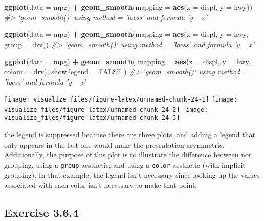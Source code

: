 \documentclass[]{book}
\newenvironment{Shaded}{\begin{snugshade}}{\end{snugshade}}
\newcommand{\CommentTok}[1]{\textcolor[rgb]{0.56,0.35,0.01}{\textit{#1}}}
\newcommand{\DataTypeTok}[1]{\textcolor[rgb]{0.13,0.29,0.53}{#1}}
\newcommand{\KeywordTok}[1]{\textcolor[rgb]{0.13,0.29,0.53}{\textbf{#1}}}
\newcommand{\NormalTok}[1]{#1}
\newcommand{\OperatorTok}[1]{\textcolor[rgb]{0.81,0.36,0.00}{\textbf{#1}}}
\newcommand{\OtherTok}[1]{\textcolor[rgb]{0.56,0.35,0.01}{#1}}
\newcommand{\StringTok}[1]{\textcolor[rgb]{0.31,0.60,0.02}{#1}}
\theoremstyle{plain}
\theoremstyle{remark}
\theoremstyle{definition}
\theoremstyle{definition}
\theoremstyle{definition}
\theoremstyle{remark}
\begin{document}
\begin{Shaded}
\begin{Highlighting}[]
\KeywordTok{ggplot}\NormalTok{(}\DataTypeTok{data =}\NormalTok{ mpg) }\OperatorTok{+}
\StringTok{  }\KeywordTok{geom_smooth}\NormalTok{(}\DataTypeTok{mapping =} \KeywordTok{aes}\NormalTok{(}\DataTypeTok{x =}\NormalTok{ displ, }\DataTypeTok{y =}\NormalTok{ hwy))}
\CommentTok{#> `geom_smooth()` using method = 'loess' and formula 'y ~ x'}

\KeywordTok{ggplot}\NormalTok{(}\DataTypeTok{data =}\NormalTok{ mpg) }\OperatorTok{+}
\StringTok{  }\KeywordTok{geom_smooth}\NormalTok{(}\DataTypeTok{mapping =} \KeywordTok{aes}\NormalTok{(}\DataTypeTok{x =}\NormalTok{ displ, }\DataTypeTok{y =}\NormalTok{ hwy, }\DataTypeTok{group =}\NormalTok{ drv))}
\CommentTok{#> `geom_smooth()` using method = 'loess' and formula 'y ~ x'}

\KeywordTok{ggplot}\NormalTok{(}\DataTypeTok{data =}\NormalTok{ mpg) }\OperatorTok{+}
\StringTok{  }\KeywordTok{geom_smooth}\NormalTok{(}
    \DataTypeTok{mapping =} \KeywordTok{aes}\NormalTok{(}\DataTypeTok{x =}\NormalTok{ displ, }\DataTypeTok{y =}\NormalTok{ hwy, }\DataTypeTok{colour =}\NormalTok{ drv),}
    \DataTypeTok{show.legend =} \OtherTok{FALSE}
\NormalTok{  )}
\CommentTok{#> `geom_smooth()` using method = 'loess' and formula 'y ~ x'}
\end{Highlighting}
\end{Shaded}

\begin{center}\texttt{[image: visualize\_files/figure-latex/unnamed-chunk-24-1]} \texttt{[image: visualize\_files/figure-latex/unnamed-chunk-24-2]} \texttt{[image: visualize\_files/figure-latex/unnamed-chunk-24-3]} \end{center}

the legend is suppressed because there are three plots, and adding a
legend that only appears in the last one would make the presentation
asymmetric. Additionally, the purpose of this plot is to illustrate the
difference between not grouping, using a \texttt{group} aesthetic, and
using a \texttt{color} aesthetic (with implicit grouping). In that
example, the legend isn't necessary since looking up the values
associated with each color isn't necessary to make that point.

\hypertarget{exercise-3.6.4}{%
\subsection*{\texorpdfstring{Exercise
{3.6.4}}{Exercise 3.6.4}}\label{exercise-3.6.4}}
\end{document}

